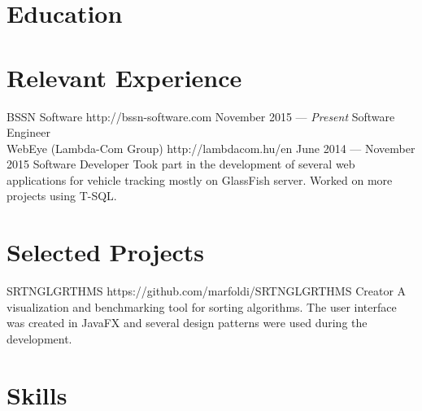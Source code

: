 \documentclass{resume}
\begin{document}

\smallskip

\section{Education}


\section{Relevant Experience}

\employer
	{BSSN Software}
	{http://bssn-software.com}
	{November 2015 --- \emph{Present}}
	{Software Engineer}
	{\\}
\employer
	{WebEye (Lambda-Com Group)}
	{http://lambdacom.hu/en}
	{June 2014 --- November 2015}
	{Software Developer}
	{Took part in the development of several web applications for vehicle tracking mostly on GlassFish server. Worked on more projects using T-SQL.}
	
\section{Selected Projects}

\project
	{SRTNGLGRTHMS}
	{https://github.com/marfoldi/SRTNGLGRTHMS}
	{Creator}
	{A visualization and benchmarking tool for sorting algorithms. The user interface was created in JavaFX and several design patterns were used during the development.}
	
\section{Skills}

\end{document}
